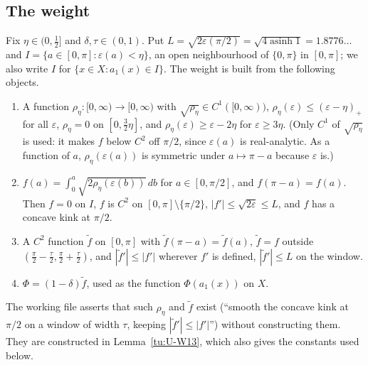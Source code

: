 \subsection{The weight}\label{tu:U-sec-weight}
Fix $\eta\in(0,\frac12]$ and $\delta,\tau\in(0,1)$. Put $L=\sqrt{2\varepsilon(\pi/2)}=\sqrt{4\operatorname{asinh}1}=1.8776\ldots$ and
$I=\{a\in[0,\pi]:\varepsilon(a)<\eta\}$, an open neighbourhood of $\{0,\pi\}$ in $[0,\pi]$; we also write $I$ for
$\{x\in X:a_1(x)\in I\}$. The weight is built from the following objects.
\begin{enumerate}
\item[(W1)] A function $\rho_\eta:[0,\infty)\to[0,\infty)$ with $\sqrt{\rho_\eta}\in C^1([0,\infty))$, $\rho_\eta(\varepsilon)\le(\varepsilon-\eta)_+$ for
all $\varepsilon$, $\rho_\eta=0$ on $[0,\frac32\eta]$, and $\rho_\eta(\varepsilon)\ge\varepsilon-2\eta$ for $\varepsilon\ge3\eta$.
(Only $C^1$ of $\sqrt{\rho_\eta}$ is used: it makes $f$ below $C^2$ off $\pi/2$, since $\varepsilon(a)$ is real-analytic. As a
function of $a$, $\rho_\eta(\varepsilon(a))$ is symmetric under $a\mapsto\pi-a$ because $\varepsilon$ is.)
\item[(W2)] $f(a)=\int_0^a\sqrt{2\rho_\eta(\varepsilon(b))}\,db$ for $a\in[0,\pi/2]$, and $f(\pi-a)=f(a)$. Then $f=0$ on $I$,
$f$ is $C^2$ on $[0,\pi]\setminus\{\pi/2\}$, $|f'|\le\sqrt{2\varepsilon}\le L$, and $f$ has a concave kink at $\pi/2$.
\item[(W3)] A $C^2$ function $\tilde f$ on $[0,\pi]$ with $\tilde f(\pi-a)=\tilde f(a)$, $\tilde f=f$ outside
$(\frac\pi2-\frac\tau2,\frac\pi2+\frac\tau2)$, and $|\tilde f'|\le|f'|$ wherever $f'$ is defined, $|\tilde f'|\le L$ on the window.
\item[(W4)] $\Phi=(1-\delta)\tilde f$, used as the function $\Phi(a_1(x))$ on $X$.
\end{enumerate}
The working file asserts that such $\rho_\eta$ and $\tilde f$ exist (``smooth the concave kink at $\pi/2$ on a window of
width $\tau$, keeping $|\tilde f'|\le|f'|$'') without constructing them. They are constructed in
Lemma~\ref{tu:U-W13}, which also gives the constants used below.

